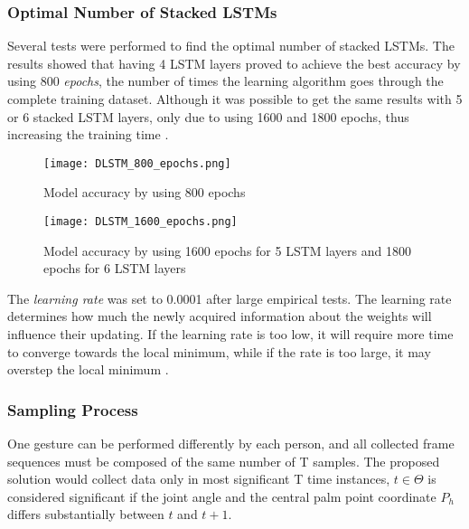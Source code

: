 \subsubsection{Optimal Number of Stacked LSTMs}
\label{sec:dlstm_params}

Several tests were performed to find the optimal number of stacked LSTMs. The results showed that having 4 LSTM layers proved to achieve the best accuracy by using 800 \textit{epochs}, the number of times the learning algorithm goes through the complete training dataset. Although it was possible to get the same results with 5 or 6 stacked LSTM layers, only due to using 1600 and 1800 epochs, thus increasing the training time \cite{avola}. 

\begin{figure}[ht]
	\centering
    \texttt{[image: DLSTM\_800\_epochs.png]}
	\caption{Model accuracy by using 800 epochs \cite{avola}}
	\label{fig:DLSTM_800_epochs}
\end{figure}

\begin{figure}[ht]
	\centering
    \texttt{[image: DLSTM\_1600\_epochs.png]}
	\caption{Model accuracy by using 1600 epochs for 5 LSTM layers and 1800 epochs for 6 LSTM layers \cite{avola}}
	\label{fig:DLSTM_1600_epochs}
\end{figure}

The \textit{learning rate} was set to 0.0001 after large empirical tests. The learning rate determines how much the newly acquired information about the weights will influence their updating. If the learning rate is too low, it will require more time to converge towards the local minimum, while if the rate is too large, it may overstep the local minimum \cite{avola}.

\subsubsection{Sampling Process}

One gesture can be performed differently by each person, and all collected frame sequences must be composed of the same number of T samples. The proposed solution would collect data only in most significant T time instances, $t \in \Theta$ is considered significant if the joint angle and the central palm point coordinate $P_h$ differs substantially between $t$ and $t+1$.


